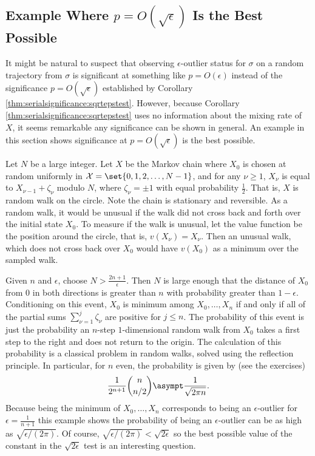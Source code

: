 \documentclass[12pt]{article}
\begin{document}
\subsection*{Example Where \( p = O(\sqrt{\epsilon}) \) Is the Best
Possible}

It might be natural to suspect that observing \( \epsilon \)-outlier
status for \( \sigma \) on a random trajectory from \( \sigma \) is
significant at something like \( p = O(\epsilon) \) instead of the
significance \( p = O(\sqrt{\epsilon}) \) established by Corollary~%
\ref{thm:serialsignificance:sqrtepstest}.  However, because Corollary~%
\ref{thm:serialsignificance:sqrtepstest} uses no information about the mixing
rate of \( X \), it seems remarkable any significance can be shown in
general.  An example in this section shows significance at \( p = O(
\sqrt{\epsilon}) \) is the best possible.

Let \( N \) be a large integer.  Let \( X \) be the Markov chain where \(
X_0 \) is chosen at random uniformly in \( \mathcal{X} = \set{0, 1, 2,
\dots , N-1} \), and for any \( \nu \ge 1 \), \( X_{\nu} \) is equal to \(
X_{\nu-1} + \zeta_{\nu} \) modulo \( N \), where \( \zeta_{\nu} = \pm 1 \)
with equal probability \( \frac{1}{2} \).  That is, \( X \) is random
walk on the circle.  Note the chain is stationary and reversible.  As a
random walk, it would be unusual if the walk did not cross back and
forth over the initial state \( X_0 \).  To measure if the walk is
unusual, let the value function be the position around the circle, that
is, \( v(X_{\nu}) = X_{\nu} \).  Then an unusual walk, which does not
cross back over \( X_0 \) would have \( v(X_0) \) as a minimum over the
sampled walk.

Given \( n \) and \( \epsilon \), choose \( N > \frac{2n+1}{\epsilon} \).
Then \( N \) is large enough that the distance of \( X_0 \) from \( 0 \)
in both directions is greater than \( n \) with probability greater than
\( 1 - \epsilon \).  Conditioning on this event, \( X_0 \) is minimum
among \( X_0, \dots , X_n \) if and only if all of the partial sums \(
\sum\limits_{\nu=1}^ {j} \zeta_\nu \) are positive for \( j \le n \).
The probability of this event is just the probability an \( n \)-step \(
1 \)-dimensional random walk from \( X_0 \) takes a first step to the
right and does not return to the origin.  The calculation of this
probability is a classical problem in random walks, solved using the
reflection principle.  In particular, for \( n \) even, the probability
is given by (see the exercises)
\[
    \frac{1}{2^{n+1}}\binom{n}{n/2} \asympt \frac{1}{\sqrt{2 \pi n}}.
\] Because being the minimum of \( X_0, \dots , X_n \) corresponds to
being an \( \epsilon \)-outlier for \( \epsilon = \frac{1}{n+1} \) this
example shows the probability of being an \( \epsilon \)-outlier can be
as high as \( \sqrt{\epsilon/(2\pi)} \).  Of course, \( \sqrt{\epsilon/
(2\pi)} < \sqrt{2\epsilon} \) so the best possible value of the constant
in the \( \sqrt{2\epsilon} \) test is an interesting question.
\end{document}
